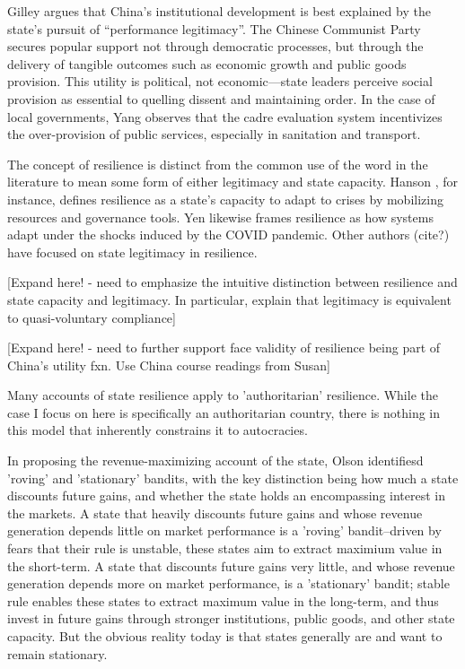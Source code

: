 \documentclass[12pt]{article}
\begin{document}
Gilley \cite{gilley2008} argues that China's institutional development is best explained by the state's pursuit of “performance legitimacy”. The Chinese Communist Party secures popular support not through democratic processes, but through the delivery of tangible outcomes such as economic growth and public goods provision. This utility is political, not economic—state leaders perceive social provision as essential to quelling dissent and maintaining order. In the case of local governments, Yang \cite{yang2004} observes that the cadre evaluation system incentivizes the over-provision of public services, especially in sanitation and transport.

The concept of resilience is distinct from the common use of the word in the literature to mean some form of either legitimacy and state capacity. Hanson \cite{hansonStateCapacityResilience2018}, for instance, defines resilience as a state's capacity to adapt to crises by mobilizing resources and governance tools. Yen \cite{yenImperativeStateCapacity2022} likewise frames resilience as how systems adapt under the shocks induced by the COVID pandemic. Other authors (cite?) have focused on state legitimacy in resilience.

[Expand here! - need to emphasize the intuitive distinction between resilience and state capacity and legitimacy. In particular, explain that legitimacy is equivalent to quasi-voluntary compliance]

[Expand here! - need to further support face validity of resilience being part of China's utility fxn. Use China course readings from Susan]

Many accounts of state resilience apply to 'authoritarian' resilience. While the case I focus on here is specifically an authoritarian country, there is nothing in this model that inherently constrains it to autocracies.

In proposing the revenue-maximizing account of the state, Olson \cite{olson1993} identifiesd 'roving' and 'stationary' bandits, with the key distinction being how much a state discounts future gains, and whether the state holds an encompassing interest in the markets. A state that heavily discounts future gains and whose revenue generation depends little on market performance is a 'roving' bandit--driven by fears that their rule is unstable, these states aim to extract maximium value in the short-term. A state that discounts future gains very little, and whose revenue generation depends more on market performance, is a 'stationary' bandit; stable rule enables these states to extract maximum value in the long-term, and thus invest in future gains through stronger institutions, public goods, and other state capacity. But the obvious reality today is that states generally are and want to remain stationary.
\end{document}
